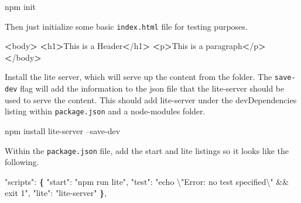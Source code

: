 \documentclass[]{book}
\newenvironment{Shaded}{\begin{snugshade}}{\end{snugshade}}
\newcommand{\KeywordTok}[1]{\textcolor[rgb]{0.13,0.29,0.53}{\textbf{#1}}}
\newcommand{\DataTypeTok}[1]{\textcolor[rgb]{0.13,0.29,0.53}{#1}}
\newcommand{\StringTok}[1]{\textcolor[rgb]{0.31,0.60,0.02}{#1}}
\newcommand{\OperatorTok}[1]{\textcolor[rgb]{0.81,0.36,0.00}{\textbf{#1}}}
\newcommand{\ExtensionTok}[1]{#1}
\newcommand{\NormalTok}[1]{#1}
\begin{document}
\begin{Shaded}
\begin{Highlighting}[]
\ExtensionTok{npm}\NormalTok{ init}
\end{Highlighting}
\end{Shaded}

Then just initialize some basic \texttt{index.html} file for testing
purposes.

\begin{Shaded}
\begin{Highlighting}[]
\OperatorTok{<}\ExtensionTok{body}\OperatorTok{>}                        
    \OperatorTok{<}\ExtensionTok{h1}\OperatorTok{>}\NormalTok{This is a Header}\OperatorTok{<}\NormalTok{/h1}\OperatorTok{>} 
    \OperatorTok{<}\ExtensionTok{p}\OperatorTok{>}\NormalTok{This is a paragraph}\OperatorTok{<}\NormalTok{/p}\OperatorTok{>}
\OperatorTok{<}\NormalTok{/}\ExtensionTok{body}\OperatorTok{>}                       
\end{Highlighting}
\end{Shaded}

Install the lite server, which will serve up the content from the
folder. The \texttt{save-dev} flag will add the information to the json
file that the lite-server should be used to serve the content. This
should add lite-server under the devDependencies listing within
\texttt{package.json} and a node-modules folder.

\begin{Shaded}
\begin{Highlighting}[]
\ExtensionTok{npm}\NormalTok{ install lite-server --save-dev}
\end{Highlighting}
\end{Shaded}

Within the \texttt{package.json} file, add the start and lite listings
so it looks like the following.

\begin{Shaded}
\begin{Highlighting}[]
\StringTok{"scripts"}\NormalTok{: }\KeywordTok{\{}                                            
  \StringTok{"start"}\NormalTok{: }\StringTok{"npm run lite"}\NormalTok{,                              }
  \StringTok{"test"}\NormalTok{: }\StringTok{"echo }\DataTypeTok{\textbackslash{}"}\StringTok{Error: no test specified}\DataTypeTok{\textbackslash{}"}\StringTok{ && exit 1"}\NormalTok{,}
  \StringTok{"lite"}\NormalTok{: }\StringTok{"lite-server"}                                 
\KeywordTok{\}}\NormalTok{,                                                      }
\end{Highlighting}
\end{Shaded}
\end{document}
